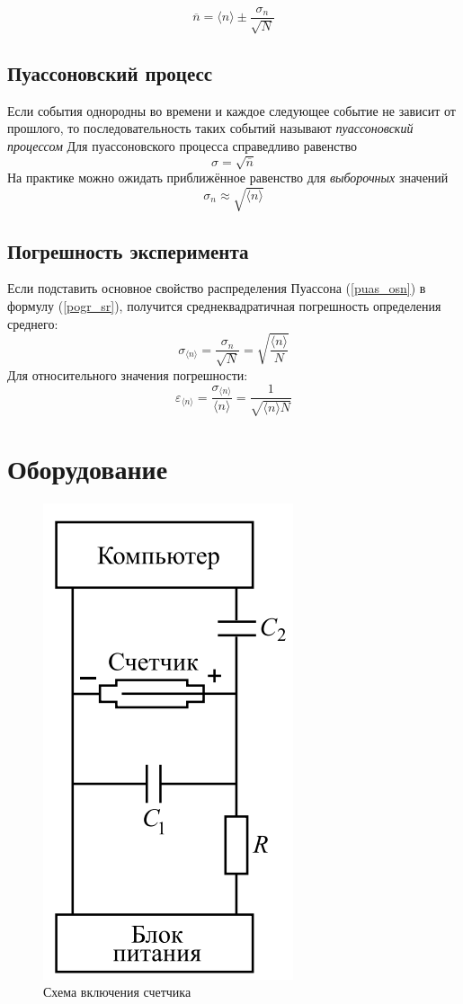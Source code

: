 \documentclass[a4paper, 12pt]{article}
\begin{document}
\begin{equation}
    \overline{n} = \langle n \rangle \pm \frac{\sigma_{n}}{\sqrt{N}}
\end{equation}

\subsection*{Пуассоновский процесс}
Если события однородны во времени и каждое следующее событие не зависит от прошлого, то последовательность таких событий называют \textit{пуассоновский процессом}
Для пуассоновского процесса справедливо равенство
\begin{equation}\label{puas_osn}
    \sigma = \sqrt{\overline{n}}
\end{equation}
На практике можно ожидать приближённое равенство для \textit{выборочных} значений
\begin{displaymath}
    \sigma_{n} \approx \sqrt{\langle n \rangle}
\end{displaymath}

\subsection*{Погрешность эксперимента}
Если подставить основное свойство распределения Пуассона (\ref{puas_osn}) в формулу (\ref{pogr_sr}), получится среднеквадратичная погрешность определения среднего:
\begin{displaymath}
    \sigma_{\langle n \rangle} = \frac{\sigma_{n}}{\sqrt{N}} = \sqrt{\frac{\langle n \rangle}{N}}
\end{displaymath}
Для относительного значения погрешности:
\begin{displaymath}
    \varepsilon_{\langle n \rangle} = \frac{\sigma_{\langle n \rangle}}{\langle n \rangle} = \frac{1}{\sqrt{\langle n \rangle N}}
\end{displaymath}

\section*{Оборудование}
\begin{figure}
\centering
\includegraphics[width=.25\textwidth]{images/scheme.png}
\caption{Схема включения счетчика}
\end{figure}
\end{document}
